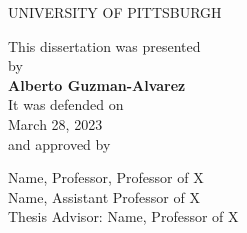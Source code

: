 
\setcounter{page}{2}

\pagestyle{plain}

\begin{center}
UNIVERSITY OF PITTSBURGH\\
\end{center}

       \vspace*{8\baselineskip}


\begin{center}
This dissertation was presented\\
by\\
       \vspace*{1\baselineskip}
\textbf{Alberto Guzman-Alvarez}\\
       \vspace*{1\baselineskip}
It was defended on\\
March 28, 2023\\
and approved by
\end{center}

\begin{center}
Name, Professor, Professor of X\\
Name, Assistant Professor of X\\
Thesis Advisor: Name, Professor of X\\
\end{center}

\newpage
